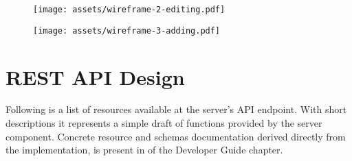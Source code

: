 \begin{figure}[h]{}
\centering\texttt{[image: assets/wireframe-2-editing.pdf]}
\caption{}

\end{figure}

\begin{figure}[h]{}
\centering\texttt{[image: assets/wireframe-3-adding.pdf]}
\caption{}

\end{figure}

\hypertarget{x-rest-api-design}{\section{REST API Design}}
Following is a list of resources available at the server’s API endpoint.
With short descriptions it represents a simple draft of functions provided 
by the server component.
Concrete resource and schemas documentation derived
directly from the implementation, is present
in \hyperlink{./13-developer-guide#server-api}{} of the
Developer Guide chapter.


